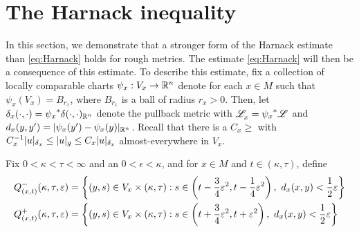 \documentclass[a4paper, 12pt]{amsart}
\begin{document}
%

\section{The Harnack inequality}
\label{sec:harnack}

In this section, we demonstrate that a
stronger form of the  Harnack 
estimate than \eqref{eq:Harnack} holds for rough 
metrics. The estimate \eqref{eq:Harnack} 
will then be a consequence of this estimate.
To describe this estimate, fix a collection of 
locally comparable charts $\psi_x:V_x \to \mathbb{R}^n$ denote
for each $x \in M$ such that $\psi_x(V_x) = B_{r_x}$,
where $B_{r_x}$ is a ball of radius $r_x > 0$. 
Then, let
$\delta_x(\cdot, \cdot) = {\psi_x}^\ast\delta(\cdot, \cdot)_{\mathbb{R}^n}$
denote the pullback metric with $\mathscr{L}^{{}}_x = {\psi_x}^\ast\mathscr{L}^{{}}$
and $d_x(y,y') = |\psi_x(y') - \psi_x(y)|_{\mathbb{R}^n}$.
Recall that there is a $C_x \geq $
with $C_x^{-1}  |u|_{\delta_x} \leq |u|_g \leq C_x |u|_{\delta_x}$
almost-everywhere in $V_x$.

Fix $0 < \kappa < \tau < \infty$ and an $0 < \epsilon < \kappa$,
and for $x \in M$ and $t \in (\kappa, \tau)$, define
\begin{equation}
\label{eq:paradef}
\begin{split} 
Q^-_{(x,t)}(\kappa, \tau, \epsilon) &= \set{(y,s) \in V_x \times (\kappa,\tau): s \in \cbrac{t - \frac{3}{4}\epsilon^2, t - \frac{1}{4} \epsilon^2},\ 
	d_x(x,y) < \frac{1}{2} \epsilon} \\
Q^+_{(x,t)}(\kappa, \tau, \epsilon) &= \set{(y,s) \in V_x \times (\kappa,\tau): s \in \cbrac{t + \frac{3}{4}\epsilon^2, t + \epsilon^2},\ 
	d_x(x,y) < \frac{1}{2} \epsilon}
\end{split}
\end{equation}
\end{document}
